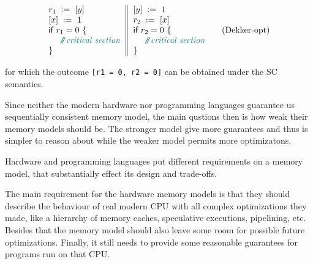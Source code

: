 \documentclass[a4paper,twoside,11pt]{article}
\numberwithin{equation}{section}
\begin{document}
\begin{equation*}
\inarrII{
  \readInst{}{r_1}{y}  \\
  \writeInst{}{x}{1} \\
  \kw{if} {r_1 = 0} ~\{ \\
  ~~ \comment{critical section} \\
  \}
}{
  \writeInst{}{y}{1} \\
  \readInst{}{r_2}{x}  \\
  \kw{if} {r_2 = 0} ~\{ \\
  ~~ \comment{critical section} \\
  \}
}
\tag{Dekker-opt}\label{ex:Dekker-opt}
\end{equation*}

for which the outcome \texttt{[r1 = 0, r2 = 0]} can be obtained under the SC semantics.


Since neither the modern hardware nor programming languages 
guarantee us sequentially consistent memory model,
the main qustions then is how weak their memory models should be.
The stronger model give more guarantees and thus is simpler to reason about 
while the weaker model permits more optimizatons. 

Hardware and programming languages put different requirements on a memory model, 
that substantially effect its design and trade-offs.

The main requirement for the hardware memory models is that 
they should describe the behaviour of real modern CPU 
with all complex optimizations they made, like a hierarchy of memory caches, speculative executions, pipelining, etc.
Besides that the memory model should also leave some room for possible future optimizations.
Finally, it still needs to provide some reasonable guarantees for programs run on that CPU.       
\end{document}
